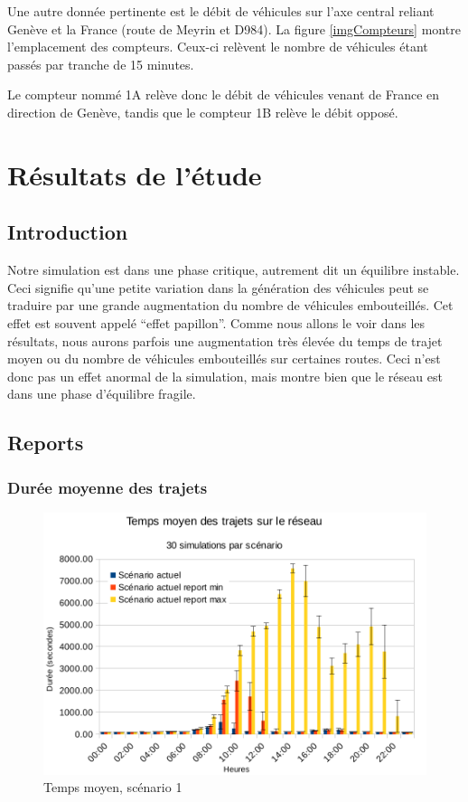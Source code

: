 \documentclass[a4paper,11pt, titlepage]{extarticle}
\begin{document}
Une autre donnée pertinente est le débit de véhicules sur l'axe central reliant Genève et la France (route de Meyrin et D984). La figure \ref{imgCompteurs} montre l'emplacement des compteurs. Ceux-ci relèvent le nombre de véhicules étant passés par tranche de 15 minutes.

Le compteur nommé 1A relève donc le débit de véhicules venant de France en direction de Genève, tandis que le compteur 1B relève le débit opposé.

\newpage

\section{Résultats de l'étude}

\subsection{Introduction}

Notre simulation est dans une phase critique, autrement dit un équilibre instable. Ceci signifie qu'une petite variation dans la génération des véhicules peut se traduire par une grande augmentation du nombre de véhicules embouteillés. Cet effet est souvent appelé ``effet papillon''. Comme nous allons le voir dans les résultats, nous aurons parfois une augmentation très élevée du temps de trajet moyen ou du nombre de véhicules embouteillés sur certaines routes. Ceci n'est donc pas un effet anormal de la simulation, mais montre bien que le réseau est dans une phase d'équilibre fragile.

\subsection{Reports}

\subsubsection{Durée moyenne des trajets}

\begin{figure}[!h]
  \begin{center}
    \includegraphics[width=13cm]{graphiques/temps_scenario1.png}
  \end{center}
  \vspace{-0.8cm}
  \caption{Temps moyen, scénario 1}
  \label{graphTemps1}
\end{figure}
\end{document}
